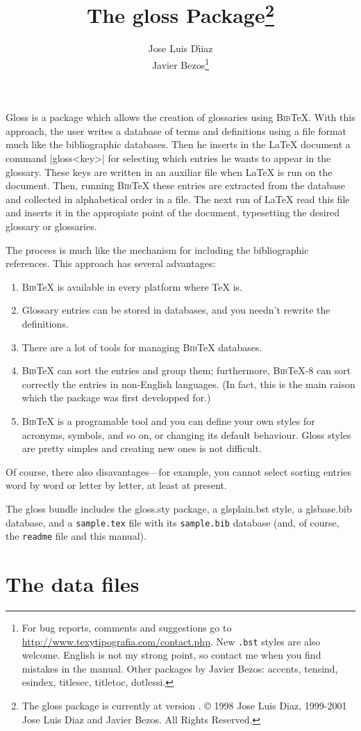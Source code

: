 \documentclass{ltxguide}
\title{The \textsf{gloss} Package\footnote{The
\textsf{gloss} package is currently at version \fileversion. \copyright{} 
1998 Jose Luis Diaz,
1999-2001 Jose Luis Diaz and Javier Bezos. All Rights Reserved.}}
\author{Jose Luis D\'{\i}iaz\\Javier Bezos\footnote{For bug reports, comments and
suggestions go to \href{http://www.texytipografia.com/contact.php}%
{http://www.texytipografia.com/contact.php}.  New \texttt{.bst} styles
are also welcome.  English is not my strong point, so contact me when
you find mistakes in the manual.  Other packages by Javier Bezos:
\textsf{accents, tensind, esindex, titlesec, titletoc, dotlessi}.}}
\date{\docdate}
\newcommand{\gloss}{\textsf{gloss}}
\newcommand{\bibTeX}{\textsc{Bib}\TeX}
\begin{document}
\maketitle

\textsf{Gloss} is a package which allows the creation of glossaries 
using \bibTeX. With this approach, the user writes a database of terms 
and definitions using a file format much like the bibliographic 
databases.  Then he inserts in the \LaTeX{} document a command 
|\gloss{<key>}| for selecting which entries he wants to appear in the 
glossary.  These keys are written in an auxiliar file when \LaTeX{} is 
run on the document.  Then, running \bibTeX{} these entries are 
extracted from the database and collected in alphabetical order in a 
file.  The next run of \LaTeX{} read this file and inserts it in the 
appropiate point of the document, typesetting the desired glossary or 
glossaries.

The process is much like the mechanism for including the bibliographic
references. This approach has several advantages:
\begin{enumerate}
\item \bibTeX{} is available in every platform where \TeX{} is.
\item Glossary entries can be stored in databases, and you needn't
  rewrite the definitions.
\item There are a lot of tools for managing \bibTeX{} databases.
\item \bibTeX{} can sort the entries and group them; furthermore,
  \bibTeX-8 can sort correctly the entries in non-English
  languages. (In fact, this is the main raison which the package
  was first developped for.)
\item \bibTeX{} is a programable tool and you can define your own 
  styles for acronyms, symbols, and so on, or changing its default 
  behaviour.  \textsf{Gloss} styles are pretty simples and creating
  new ones is not difficult.
\end{enumerate}

Of course, there also disavantages---for example, you cannot
select sorting entries word by word or letter by letter, at least
at present.

The gloss{} bundle includes the \textsf{gloss}.sty package, a 
\textsf{glsplain}.bst style, a \textsf{glsbase}.bib database, and a 
\texttt{sample.tex} file with its \texttt{sample.bib} database 
(and, of course, the \texttt{readme} file and this manual).

\section{The data files}
\end{document}

